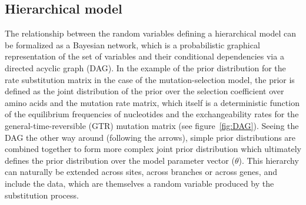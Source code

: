 \subsection{Hierarchical model}
\label{sec:intro-hierarchical-models}
The relationship between the random variables defining a hierarchical model can be formalized as a Bayesian network, which is a probabilistic graphical representation of the set of variables and their conditional dependencies via a directed acyclic graph (DAG).
In the example of the prior distribution for the rate substitution matrix in the case of the mutation-selection model, the prior is defined as the joint distribution of the prior over the selection coefficient over amino acids and the mutation rate matrix, which itself is a deterministic function of the equilibrium frequencies of nucleotides and the exchangeability rates for the general-time-reversible (\acrshort{GTR}) mutation matrix (see figure~\ref{fig:DAG}).
Seeing the DAG the other way around (following the arrows), simple prior distributions are combined together to form more complex joint prior distribution which ultimately defines the prior distribution over the model parameter vector ($\theta$).
This hierarchy can naturally be extended across sites, across branches or across genes, and include the data, which are themselves a random variable produced by the substitution process.
